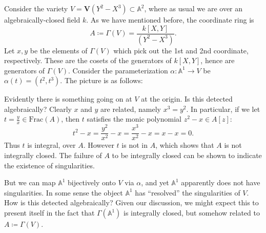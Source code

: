 \documentclass[12pt]{article}
\begin{document}
\begin{example}
	Consider the variety $V=\mathbf{V}(Y^2-X^3)\subset\mathbb{A}^2$, where as usual we are over an algebraically-closed field $k$. As we have mentioned before, the coordinate ring is 
	\begin{equation*}
		A \coloneqq \Gamma(V) = \frac{k[X,Y]}{(Y^2-X^3)}.
	\end{equation*}
	Let $x,y$ be the elements of $\Gamma(V)$ which pick out the 1st and 2nd coordinate, respectively. These are the cosets of the generators of $k[X,Y]$, hence are generators of $\Gamma(V)$. Consider the parameterization $\alpha:\mathbb{A}^1\to V$ be $\alpha(t)=(t^2,t^3)$. The picture is as follows:

	\begin{centering}
	\end{centering}

	Evidently there is something going on at $V$ at the origin. Is this detected algebraically? Clearly $x$ and $y$ are related, namely $x^3=y^2$. In particular, if we let $t=\frac{y}{x}\in\text{Frac}(A)$, then $t$ satisfies the monic polynomial $z^2-x\in A[z]$:
	\begin{equation*}
		t^2 - x = \frac{y^2}{x^2}-x = \frac{x^3}{x^2} - x = x - x = 0.	
	\end{equation*}
	Thus $t$ is integral, over $A$. However $t$ is not in $A$, which shows that $A$ is not integrally closed. The failure of $A$ to be integrally closed can be shown to indicate the existence of singularities.
	
	But we can map $\mathbb{A}^1$ bijectively onto $V$ via $\alpha$, and yet $\mathbb{A}^1$ apparently does not have singularities. In some sense the object $\mathbb{A}^1$ has ``resolved'' the singularities of $V$. How is this detected algebraically? Given our discussion, we might expect this to present itself in the fact that $\Gamma(\mathbb{A}^1)$ is integrally closed, but somehow related to $A\coloneqq\Gamma(V)$.


\end{example}
\end{document}
